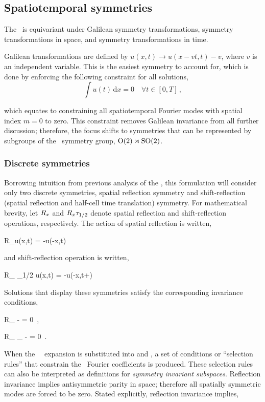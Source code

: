 \subsection{Spatiotemporal symmetries}
\label{subsubsection:symmetries}
The \KSe\ is equivariant under Galilean symmetry transformations,
 symmetry transformations in space, and  symmetry transformations in time.

Galilean transformations are defined by $u(x,t) \rightarrow u(x-vt,t)-v$,
where $v$ is an independent variable. This is the easiest symmetry to account for,
which is done by enforcing the following constraint for all solutions,
\[
\int u(t) \, \text{d}x = 0 \quad \forall t \in [0,T]
\,,
\]

which equates to constraining all spatiotemporal Fourier modes with spatial index $m=0$ to zero.
This constraint removes Galilean invariance from all further discussion; therefore, the focus shifts
to symmetries that can be represented by subgroups of the \spt\ symmetry group, $\textrm{O}(2) \rtimes \textrm{SO}(2)$.

\subsubsection{Discrete symmetries}
Borrowing intuition from previous analysis of the \KSe{}, this formulation
will consider only two discrete symmetries,
spatial reflection symmetry and shift-reflection
(spatial reflection and half-cell time translation) symmetry.
For mathematical brevity, let $R_{x}$ and $R_{x} \tau_{1/2}$
denote spatial reflection and shift-reflection operations, respectively.
The action of spatial reflection is written,

\beq
R_{\conf}u(x,t) = -u(-x,t)
\eeq

and shift-reflection operation is written,

\beq
R_{\conf} \tau_{1/2} u(x,t) = -u(-x,t+)
\eeq

Solutions that display these symmetries satisfy the corresponding invariance conditions,

\beq
R_{\conf} \ufield - \ufield = 0 \,,

\beq
R_{\conf} \tau_{\zeit} \ufield - \ufield = 0
\,.

When the \rv\ \sFb\ expansion  is substituted into  and ,
a set of conditions or ``selection rules'' that constrain
the \spt\ Fourier coefficients is produced. These selection rules can also be interpreted as definitions
for \emph{symmetry invariant subspaces}. Reflection invariance implies antisymmetric parity in space; therefore all spatially
symmetric modes are forced to be zero. Stated explicitly, reflection invariance implies,

